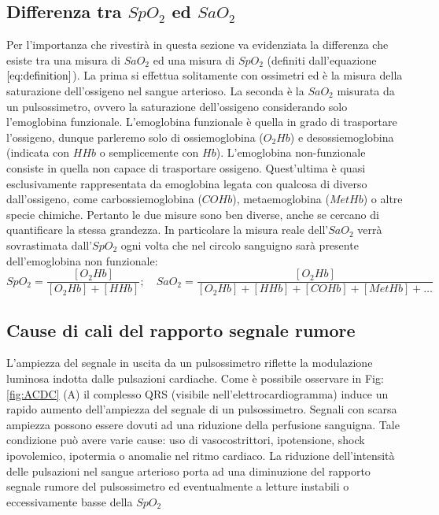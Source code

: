 \documentclass[a4paper, 12pt]{book}
\begin{document}
\subsection{Differenza tra \texorpdfstring{$SpO_2$}{SpO_2} ed \texorpdfstring{$SaO_2$}{SaO_2}}

Per l'importanza che rivestirà in questa sezione va evidenziata la differenza che esiste tra una misura di $SaO_2$ ed una misura di $SpO_2$ (definiti dall'equazione $\ref{eq:definition}$).
La prima si effettua solitamente con ossimetri ed è la misura della saturazione dell'ossigeno nel sangue arterioso.
La seconda è la $SaO_2$ misurata da un pulsossimetro, ovvero la saturazione dell'ossigeno considerando solo l'emoglobina funzionale.
L'emoglobina funzionale è quella in grado di trasportare l'ossigeno, dunque parleremo solo di ossiemoglobina ($O_2Hb$) e desossiemoglobina (indicata con $HHb$ o semplicemente con $Hb$).
L'emoglobina non-funzionale consiste in quella non capace di trasportare ossigeno.
Quest'ultima è quasi esclusivamente rappresentata da emoglobina legata con qualcosa di diverso dall'ossigeno, come carbossiemoglobina ($COHb$), metaemoglobina ($MetHb$) o altre specie chimiche.
Pertanto le due misure sono ben diverse, anche se cercano di quantificare la stessa grandezza.
In particolare la misura reale dell'$SaO_2$ verrà sovrastimata dall'$SpO_2$ ogni volta che nel circolo sanguigno sarà presente dell'emoglobina non funzionale:
\begin{equation}
	\label{eq:definition}
	SpO_2 = \frac{[O_2Hb]}{[O_2Hb]+[HHb]}; \quad SaO_2 = \frac{[O_2Hb]}{[O_2Hb]+[HHb]+			[COHb]+[MetHb]+\ldots}
\end{equation}


\subsection{Cause di cali del rapporto segnale rumore}

L'ampiezza del segnale in uscita da un pulsossimetro riflette la modulazione luminosa indotta dalle pulsazioni cardiache.
Come è possibile osservare in Fig:\ref{fig:ACDC} (A) il complesso QRS (visibile nell'elettrocardiogramma) induce un rapido aumento dell'ampiezza del segnale di un pulsossimetro.
Segnali con scarsa ampiezza possono essere dovuti ad una riduzione della perfusione sanguigna. Tale condizione può avere varie cause: uso di vasocostrittori, ipotensione, shock ipovolemico, ipotermia o anomalie nel ritmo cardiaco.
La riduzione dell'intensità delle pulsazioni nel sangue arterioso porta ad una diminuzione del rapporto segnale rumore del pulsossimetro ed eventualmente a letture instabili o eccessivamente basse della $SpO_2$
\end{document}
